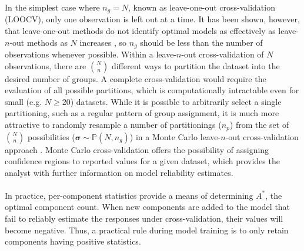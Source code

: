 \begin{doublespace}
In the simplest case where $n_g = N$, known as leave-one-out cross-validation
(LOOCV), only one observation is left out at a time. It has been shown,
however, that leave-one-out methods do not identify optimal models as
effectively as leave-$n$-out methods as $N$ increases \cite{shao:jasa1993},
so $n_g$ should be less than the number of observations whenever possible.
Within a leave-$n$-out cross-validation of $N$ observations, there are
$\binom{N}{n}$ different ways to partition the dataset into the desired
number of groups. A complete cross-validation would require the evaluation
of all possible partitions, which is computationally intractable even for
small (e.g. $N \ge 20$) datasets. While it is possible to arbitrarily select
a single partitioning, such as a regular pattern of group assignment, it is
much more attractive to randomly resample a number of partitionings ($n_p$)
from the set of $\binom{N}{n}$ possibilities
($\boldsymbol{\sigma} \sim \mathbb{P}(N,n_g)$) in a
Monte Carlo leave-$n$-out cross-validation approach \cite{xu:cils2001}. Monte
Carlo cross-validation offers the possibility of assigning confidence regions
to reported \qsq{} values for a given dataset, which provides the analyst with
further information on model reliability estimates.
\\\\
In practice, per-component \qsq{} statistics provide a means of determining
$A^\ast$, the optimal component count. When new components are added to the
model that fail to reliably estimate the responses under cross-validation,
their \qsq{} values will become negative. Thus, a practical rule during model
training is to only retain components having positive \qsq{} statistics.
\end{doublespace}

